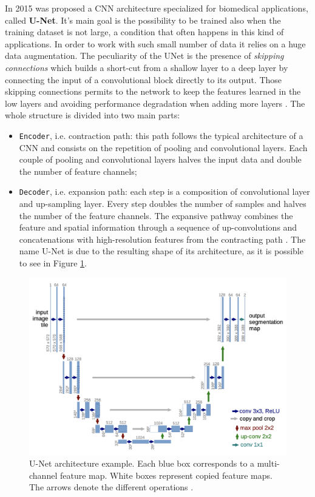 \documentclass{standalone}
\begin{document}
In 2015 was proposed a CNN architecture specialized for biomedical applications, called \textbf{U-Net}. It's main goal is the possibility to be trained also when the training dataset is not large, a condition that often happens in this kind of applications. In order to work with such small number of data it relies on a huge data augmentation.  
The peculiarity of the UNet is the presence of \emph{skipping connections} which builds a short-cut from a shallow layer to a deep layer by connecting the input of a convolutional block directly to its output. Those skipping connections permits to the network to keep the features learned in the low layers and avoiding performance degradation when adding more layers \cite{ART:skip_connections}.
The whole structure is divided into two main parts:
\begin{itemize}
    \item \texttt{Encoder}, i.e. contraction path: this path follows the typical architecture of a CNN and consists on the repetition of pooling and convolutional layers. Each couple of pooling and convolutional layers halves the input data and double the number of feature channels;
    \item \texttt{Decoder}, i.e. expansion path: each step is a composition of convolutional layer and up-sampling layer. Every step doubles the number of samples and halves the number of the feature channels.
    The expansive pathway combines the feature and spatial information through a sequence of up-convolutions and concatenations with high-resolution features from the contracting path \cite{ART:UNet}.
    The name U-Net is due to the resulting shape of its architecture, as it is possible to see in Figure \ref{fig:UNet}.
\end{itemize}

\begin{figure}[h!]
		\centering
             \includegraphics[scale=0.42]{img/Chap1/UNET.png}
		\caption{U-Net architecture example. Each blue box corresponds to a multi-channel feature map. White boxes represent copied feature maps. The arrows denote the different operations \cite{ART:UNet}. }
		\label{fig:UNet}
\end{figure}
\end{document}
